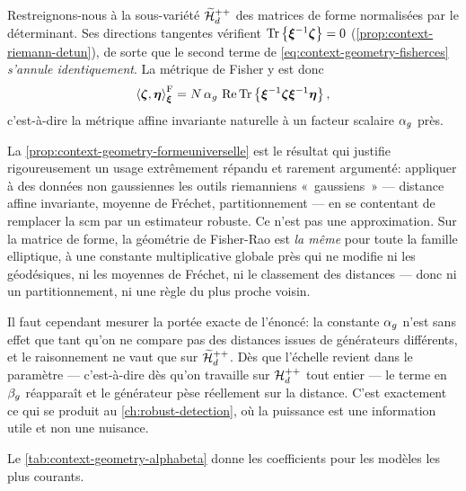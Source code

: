 \begin{property}
\label{prop:context-geometry-formeuniverselle}
  Restreignons-nous à la sous-variété $\widetilde{\mathcal{H}}_{d}^{++}$ des matrices de forme normalisées par le déterminant. Ses directions tangentes vérifient $\operatorname{\operatorname{Tr}}\left\{{\boldsymbol{\xi}}^{-1}\boldsymbol{\zeta}\right\}=0$ (\cref{prop:context-riemann-detun}), de sorte que le second terme de \cref{eq:context-geometry-fisherces} \emph{s'annule identiquement}. La métrique de Fisher y est donc
  \begin{equation}
    \left\langle \boldsymbol{\zeta}, \boldsymbol{\eta} \right\rangle_{\boldsymbol{\xi}}^{\mathrm{F}}
    =
    N\,\alpha_g\,\operatorname{\operatorname{Re}}\operatorname{\operatorname{Tr}}\left\{{\boldsymbol{\xi}}^{-1}\boldsymbol{\zeta}{\boldsymbol{\xi}}^{-1}\boldsymbol{\eta}\right\},
    \label{eq:context-geometry-fisherforme}
  \end{equation}
  c'est-à-dire la métrique affine invariante naturelle à un facteur scalaire $\alpha_g$ près.
\end{property}

\begin{remark}
\label{rem:context-geometry-legitimation}
  La \cref{prop:context-geometry-formeuniverselle} est le résultat qui justifie rigoureusement un usage extrêmement répandu et rarement argumenté: appliquer à des données non gaussiennes les outils riemanniens «~gaussiens~» --- distance affine invariante, moyenne de Fréchet, partitionnement --- en se contentant de remplacer la scm par un estimateur robuste. Ce n'est pas une approximation. Sur la matrice de forme, la géométrie de Fisher-Rao est \emph{la même} pour toute la famille elliptique, à une constante multiplicative globale près qui ne modifie ni les géodésiques, ni les moyennes de Fréchet, ni le classement des distances --- donc ni un partitionnement, ni une règle du plus proche voisin.

  Il faut cependant mesurer la portée exacte de l'énoncé: la constante $\alpha_g$ n'est sans effet que tant qu'on ne compare pas des distances issues de générateurs différents, et le raisonnement ne vaut que sur $\widetilde{\mathcal{H}}_{d}^{++}$. Dès que l'échelle revient dans le paramètre --- c'est-à-dire dès qu'on travaille sur $\mathcal{H}_{d}^{++}$ tout entier --- le terme en $\beta_g$ réapparaît et le générateur pèse réellement sur la distance. C'est exactement ce qui se produit au \cref{ch:robust-detection}, où la puissance est une information utile et non une nuisance.
\end{remark}

Le \cref{tab:context-geometry-alphabeta} donne les coefficients pour les modèles les plus courants.

